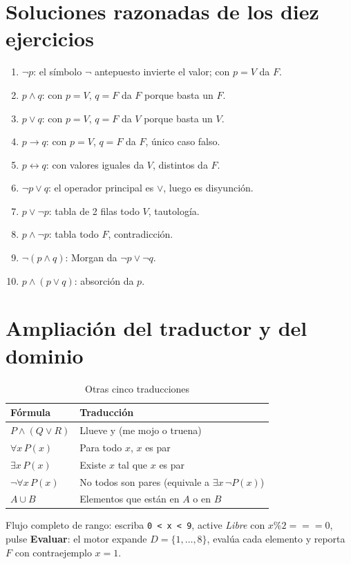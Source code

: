 \documentclass[11pt,a4paper,openany]{book}
\begin{document}
\chapter{Soluciones razonadas de los diez ejercicios}
\label{ch:sol10}
\begin{enumerate}[leftmargin=*]
\item $\lnot p$: el s\'imbolo $\lnot$ antepuesto invierte el valor; con $p = V$ da $F$.
\item $p \land q$: con $p = V$, $q = F$ da $F$ porque basta un $F$.
\item $p \lor q$: con $p = V$, $q = F$ da $V$ porque basta un $V$.
\item $p \to q$: con $p = V$, $q = F$ da $F$, \'unico caso falso.
\item $p \leftrightarrow q$: con valores iguales da $V$, distintos da $F$.
\item $\lnot p \lor q$: el operador principal es $\lor$, luego es disyunci\'on.
\item $p \lor \lnot p$: tabla de 2 filas todo $V$, tautolog\'ia.
\item $p \land \lnot p$: tabla todo $F$, contradicci\'on.
\item $\lnot(p \land q)$: Morgan da $\lnot p \lor \lnot q$.
\item $p \land (p \lor q)$: absorci\'on da $p$.
\end{enumerate}

\chapter{Ampliaci\'on del traductor y del dominio}
\label{ch:trad-dom}
\begin{table}[H]
\centering
\caption{Otras cinco traducciones}
\begin{tabular}{ll}
\toprule
F\'ormula & Traducci\'on \\
\midrule
$P \land (Q \lor R)$ & Llueve y (me mojo o truena) \\
$\forall x\,P(x)$ & Para todo $x$, $x$ es par \\
$\exists x\,P(x)$ & Existe $x$ tal que $x$ es par \\
$\lnot\forall x\,P(x)$ & No todos son pares (equivale a $\exists x\,\lnot P(x)$) \\
$A \cup B$ & Elementos que est\'an en $A$ o en $B$ \\
\bottomrule
\end{tabular}
\end{table}
Flujo completo de rango: escriba \texttt{0 < x < 9}, active \textit{Libre} con $x \% 2 === 0$, pulse \textbf{Evaluar}: el motor expande $D = \{1,\ldots,8\}$, eval\'ua cada elemento y reporta $F$ con contraejemplo $x = 1$.
\end{document}
